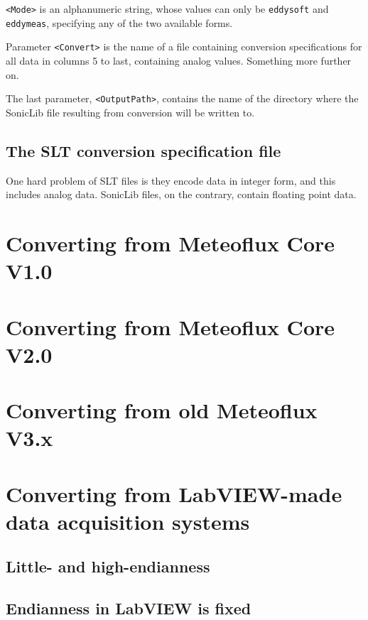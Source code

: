 \documentclass[a4paper,10pt]{book}
\begin{document}
\verb|<Mode>| is an alphanumeric string, whose values can only be \verb|eddysoft| and \verb|eddymeas|, specifying any of the two available forms.

Parameter \verb|<Convert>| is the name of a file containing conversion specifications for all data in columns 5 to last, containing analog values. Something more further on.

The last parameter, \verb|<OutputPath>|, contains the name of the directory where the SonicLib file resulting from conversion will be written to.

\subsection{The SLT conversion specification file}

One hard problem of SLT files is they encode data in integer form, and this includes analog data. SonicLib files, on the contrary, contain floating point data.

\section{Converting from Meteoflux Core V1.0}
\label{sec:Convert MFC1}

\section{Converting from Meteoflux Core V2.0}
\label{sec:Convert MFC2}

\section{Converting from old Meteoflux V3.x}
\label{sec:Convert MFX3}

\section{Converting from LabVIEW-made data acquisition systems}
\label{sec:Convert LV}

\subsection{Little- and high-endianness}

\subsection{Endianness in LabVIEW is fixed}
\end{document}
